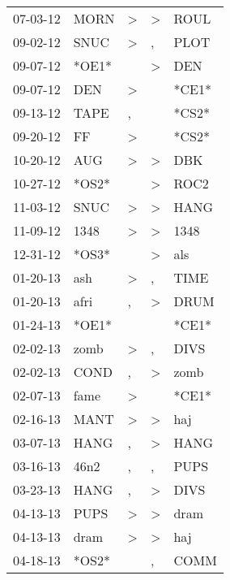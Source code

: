 \begin{supertabular}{lllll}
 07-03-12 &   MORN &     \textgreater &     \textgreater &   ROUL \\
 09-02-12 &   SNUC &     \textgreater &                , &   PLOT \\
 09-07-12 &  *OE1* &                  &     \textgreater &    DEN \\
 09-07-12 &    DEN &     \textgreater &                  &  *CE1* \\
 09-13-12 &   TAPE &                , &                  &  *CS2* \\
 09-20-12 &     FF &     \textgreater &                  &  *CS2* \\
 10-20-12 &    AUG &     \textgreater &     \textgreater &    DBK \\
 10-27-12 &  *OS2* &                  &     \textgreater &   ROC2 \\
 11-03-12 &   SNUC &     \textgreater &     \textgreater &   HANG \\
 11-09-12 &   1348 &     \textgreater &     \textgreater &   1348 \\
 12-31-12 &  *OS3* &                  &     \textgreater &    als \\
 01-20-13 &    ash &     \textgreater &                , &   TIME \\
 01-20-13 &   afri &                , &     \textgreater &   DRUM \\
 01-24-13 &  *OE1* &                  &                  &  *CE1* \\
 02-02-13 &   zomb &     \textgreater &                , &   DIVS \\
 02-02-13 &   COND &                , &     \textgreater &   zomb \\
 02-07-13 &   fame &     \textgreater &                  &  *CE1* \\
 02-16-13 &   MANT &     \textgreater &     \textgreater &    haj \\
 03-07-13 &   HANG &                , &     \textgreater &   HANG \\
 03-16-13 &   46n2 &                , &                , &   PUPS \\
 03-23-13 &   HANG &                , &     \textgreater &   DIVS \\
 04-13-13 &   PUPS &     \textgreater &     \textgreater &   dram \\
 04-13-13 &   dram &     \textgreater &     \textgreater &    haj \\
 04-18-13 &  *OS2* &                  &                , &   COMM \\

\end{supertabular}
